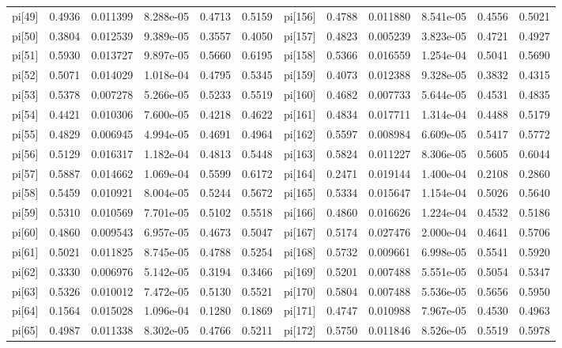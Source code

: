\documentclass[12pt]{article}
\begin{document}
\begin{table}[h!]
\begin{tabular}{|llllll|llllll|}
pi[49] & 0.4936 & 0.011399   & 8.288e-05 & 0.4713 &0.5159 & pi[156] & 0.4788 & 0.011880  & 8.541e-05 & 0.4556 &0.5021 \\
pi[50] & 0.3804 & 0.012539   & 9.389e-05 & 0.3557 &0.4050 & pi[157] & 0.4823 & 0.005239  & 3.823e-05 & 0.4721 &0.4927 \\
pi[51] & 0.5930 & 0.013727   & 9.897e-05 & 0.5660 &0.6195 & pi[158] & 0.5366 & 0.016559 & 1.254e-04 & 0.5041 &0.5690 \\
pi[52] & 0.5071 & 0.014029   & 1.018e-04 & 0.4795 &0.5345 & pi[159] & 0.4073 & 0.012388  & 9.328e-05 & 0.3832 &0.4315 \\
pi[53] & 0.5378 & 0.007278   & 5.266e-05 & 0.5233 &0.5519 & pi[160] & 0.4682 & 0.007733   & 5.644e-05 & 0.4531 &0.4835 \\
pi[54] & 0.4421 & 0.010306   & 7.600e-05 & 0.4218 &0.4622 & pi[161] & 0.4834 & 0.017711   & 1.314e-04 & 0.4488 &0.5179 \\
pi[55] & 0.4829 & 0.006945   & 4.994e-05 & 0.4691 &0.4964 & pi[162] & 0.5597 & 0.008984   & 6.609e-05 & 0.5417 &0.5772 \\
pi[56] & 0.5129 & 0.016317   & 1.182e-04 & 0.4813 &0.5448 & pi[163] & 0.5824 & 0.011227   & 8.306e-05 & 0.5605 &0.6044 \\
pi[57] & 0.5887 & 0.014662   & 1.069e-04 & 0.5599 &0.6172 & pi[164] & 0.2471 & 0.019144   & 1.400e-04 & 0.2108 &0.2860 \\
pi[58] & 0.5459 & 0.010921   & 8.004e-05 & 0.5244 &0.5672 & pi[165] & 0.5334 & 0.015647   & 1.154e-04 & 0.5026 &0.5640 \\
pi[59] & 0.5310 & 0.010569   & 7.701e-05 & 0.5102 &0.5518 & pi[166] & 0.4860 & 0.016626   & 1.224e-04 & 0.4532 &0.5186 \\
pi[60] & 0.4860 & 0.009543   & 6.957e-05 & 0.4673 &0.5047 & pi[167] & 0.5174 & 0.027476   & 2.000e-04 & 0.4641 &0.5706 \\
pi[61] & 0.5021 & 0.011825   & 8.745e-05 & 0.4788 &0.5254 & pi[168] & 0.5732 & 0.009661   & 6.998e-05 & 0.5541 &0.5920 \\
pi[62] & 0.3330 & 0.006976   & 5.142e-05 & 0.3194 &0.3466 & pi[169] & 0.5201 & 0.007488   & 5.551e-05 & 0.5054 &0.5347 \\
pi[63] & 0.5326 & 0.010012   & 7.472e-05 & 0.5130 &0.5521 &pi[170] & 0.5804 & 0.007488  & 5.536e-05 & 0.5656 &0.5950 \\
pi[64] & 0.1564 & 0.015028   & 1.096e-04 & 0.1280 &0.1869 &pi[171] & 0.4747 & 0.010988  & 7.967e-05 & 0.4530 &0.4963 \\
pi[65] & 0.4987 & 0.011338   & 8.302e-05 & 0.4766 &0.5211 &pi[172] & 0.5750 & 0.011846  & 8.526e-05 & 0.5519 &0.5978\\

\end{tabular}
\end{table}
\end{document}
